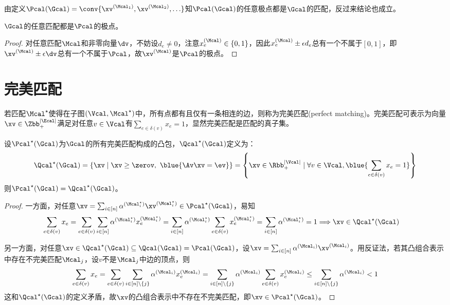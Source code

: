 \documentclass{ctexart}
\begin{document}
由定义$\Pcal (\Gcal) = \conv \{ \xv^{(\Mcal_1)}, \xv^{(\Mcal_2)}, \ldots \}$知$\Pcal (\Gcal)$的任意极点都是$\Gcal$的匹配，反过来结论也成立。

\begin{theorem} \label{thm: extreme-point-matching}
    $\Gcal$的任意匹配都是$\Pcal$的极点。
\end{theorem}

\begin{proof}
    对任意匹配$\Mcal$和非零向量$\dv$，不妨设$d_e \neq 0$，注意$x^{(\Mcal)}_e \in \{0, 1\}$，因此$x^{(\Mcal)}_e \pm \epsilon d_e$总有一个不属于$[0,1]$，即$\xv^{(\Mcal)} \pm \epsilon \dv$总有一个不属于$\Pcal$，故$\xv^{(\Mcal)}$是$\Pcal$的极点。
\end{proof}

\section{完美匹配}

若匹配$\Mcal^\star$使得在子图$(\Vcal, \Mcal^\star)$中，所有点都有且仅有一条相连的边，则称为完美匹配(perfect matching)。完美匹配可表示为向量$\xv \in \Zbb_+^{|\Ecal|}$满足对任意$v \in \Vcal$有$\sum_{e \in \delta(v)} x_e = 1$，显然完美匹配是匹配的真子集。

\begin{theorem}
    设$\Pcal^\star (\Gcal)$为$\Gcal$的所有完美匹配构成的凸包，$\Qcal^\star (\Gcal)$定义为：
    \begin{align*}
        \Qcal^\star (\Gcal) = \{ \xv \mid \xv \ge \zerov, ~ \blue{\Av \xv = \ev} \} = \left\{ \xv \in \Rbb_+^{|\Vcal|} \mid \forall v \in \Vcal, \blue{\sum_{e \in \delta(v)} x_e = 1} \right\}
    \end{align*}
    则$\Pcal^\star (\Gcal) = \Qcal^\star (\Gcal)$。
\end{theorem}

\begin{proof}
    一方面，对任意$\xv = \sum_{i \in [n]} \alpha^{(\Mcal_i^\star)} \xv^{(\Mcal_i^\star)} \in \Pcal^\star(\Gcal)$，易知
    \begin{align*}
        \sum_{e \in \delta(v)} x_e & = \sum_{e \in \delta(v)} \sum_{i \in [n]} \alpha^{(\Mcal_i^\star)} x^{(\Mcal_i^\star)}_e = \sum_{i \in [n]} \alpha^{(\Mcal_i^\star)} \sum_{e \in \delta(v)} x_e^{(\Mcal_i^\star)} = \sum_{i \in [n]} \alpha^{(\Mcal_i^\star)} = 1 \Longrightarrow \xv \in \Qcal^\star (\Gcal)
    \end{align*}

    另一方面，对任意$\xv \in \Qcal^\star(\Gcal) \subseteq \Qcal(\Gcal) = \Pcal(\Gcal)$，设$\xv = \sum_{i \in [n]} \alpha^{(\Mcal_i)} \xv^{(\Mcal_i)}$。用反证法，若其凸组合表示中存在不完美匹配$\Mcal_j$，设$v$不是$\Mcal_j$中边的顶点，则
    \begin{align*}
        \sum_{e \in \delta(v)} x_e = \sum_{e \in \delta(v)} \sum_{i \in [n] \setminus \{j\}} \alpha^{(\Mcal_i)} x_e^{(\Mcal_i)} = \sum_{i \in [n] \setminus \{j\}} \alpha^{(\Mcal_i)} \sum_{e \in \delta(v)} x_e^{(\Mcal_i)} \le \sum_{i \in [n] \setminus \{j\}} \alpha^{(\Mcal_i)} < 1
    \end{align*}
    这和$\Qcal^\star (\Gcal)$的定义矛盾，故$\xv$的凸组合表示中不存在不完美匹配，即$\xv \in \Pcal^\star (\Gcal)$。
\end{proof}
\end{document}
